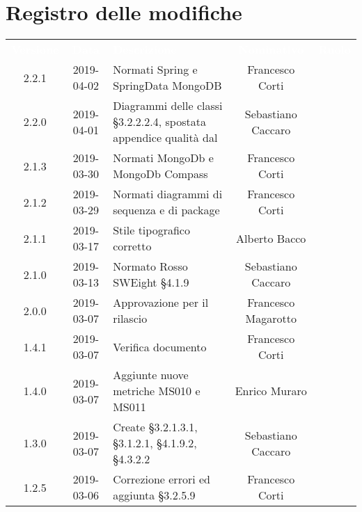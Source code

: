 
\section*{Registro delle modifiche}
{
	\renewcommand{\arraystretch}{1.5}
	\centering
	\begin{longtable}{ c c C{4cm} c c }
		
		\textcolor{white}{\textbf{Versione}} & \textcolor{white}{\textbf{Data}} & \textcolor{white}{\textbf{Descrizione}} & \textcolor{white}{\textbf{Nominativo}} & \textcolor{white}{\textbf{Ruolo}}\\
		2.2.1 & 2019-04-02 & Normati Spring e SpringData MongoDB & Francesco Corti & \reda{} \\		
		
		2.2.0 & 2019-04-01 & Diagrammi delle classi §3.2.2.2.4, spostata appendice qualità dal \PdQ & Sebastiano Caccaro & \reda{} \\		
		
		2.1.3 & 2019-03-30 & Normati MongoDb e MongoDb Compass & Francesco Corti & \reda{} \\		
		
		2.1.2 & 2019-03-29 & Normati diagrammi di sequenza e di package & Francesco Corti & \reda{} \\	
		
		2.1.1 & 2019-03-17 & Stile tipografico corretto & Alberto Bacco & \reda{} \\	
		
		2.1.0 & 2019-03-13 & Normato Rosso SWEight §4.1.9 & Sebastiano Caccaro & \reda{} \\			
		
		2.0.0 & 2019-03-07 & Approvazione per il rilascio & Francesco Magarotto & \Res{} \\		
		
		1.4.1 & 2019-03-07 & Verifica documento & Francesco Corti & \ver{} \\	
		
		1.4.0 & 2019-03-07 & Aggiunte nuove metriche MS010 e MS011 & Enrico Muraro & \reda{} \\
		
		1.3.0 & 2019-03-07 & Create §3.2.1.3.1, §3.1.2.1, §4.1.9.2, §4.3.2.2 & Sebastiano Caccaro & \reda{} \\
		
		1.2.5 & 2019-03-06 & Correzione errori ed aggiunta §3.2.5.9 & Francesco Corti & \reda{} \\
		

\end{longtable}}
